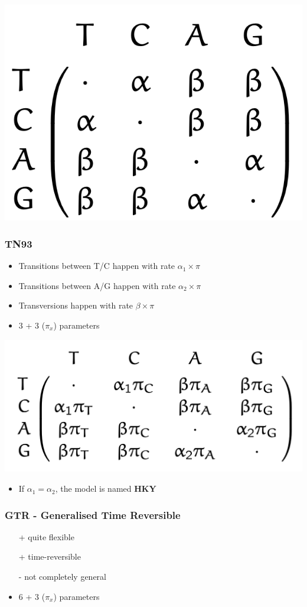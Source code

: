 \documentclass{article}
\begin{document}
\begin{multicols*}{3}
\begin{center}
    \includegraphics[width=0.5\linewidth]{k80.png}
\end{center}

\subsubsection{TN93}
\begin{itemize}
    \item Transitions between T/C happen with rate $\alpha_1 \times \pi$
    \item Transitions between A/G happen with rate $\alpha_2 \times \pi$
    \item Transversions happen with rate $\beta\times \pi$
    \item 3 + 3 ($\pi_x$) parameters 
\end{itemize}

\begin{center}
    \includegraphics[width=0.7\linewidth]{tn93.png}
\end{center}

\begin{itemize}
    \item If $\alpha_1 = \alpha_2$, the model is named \textbf{HKY}
\end{itemize}

\subsubsection{GTR - Generalised Time Reversible}

\begin{itemize}
    \item[+] quite flexible
    \item[+] time-reversible
    \item[-] not completely general
    \item 6 + 3 ($\pi_x$) parameters 
\end{itemize}


\end{multicols*}
\end{document}
